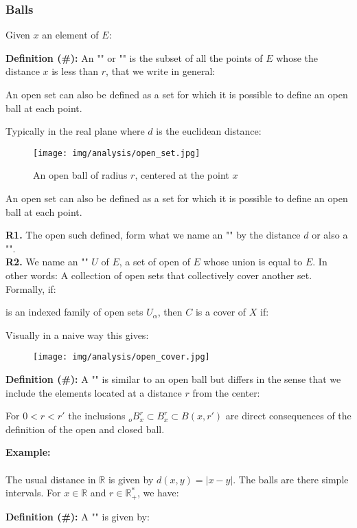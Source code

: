 	\subsubsection{Balls}
	Given $x$ an element of $E$:
	
	\textbf{Definition (\#\mydef):} An "" or "" is the subset of all the points of $E$ whose the distance $x$ is less than $r$, that we write in general:
	
	An open set can also be defined as a set for which it is possible to define an open ball at each point.
	
	Typically in the real plane where $d$ is the euclidean distance:
	
	\begin{figure}[H]
		\centering
		\texttt{[image: img/analysis/open\_set.jpg]}
		\caption{An open ball of radius $r$, centered at the point $x$}
	\end{figure}
	An open set can also be defined as a set for which it is possible to define an open ball at each point.
	\begin{tcolorbox}[title=Remarks,colframe=black,arc=10pt]
	\textbf{R1.} The open such defined, form what we name an "" by the distance $d$ or also a "".\\
	
	\textbf{R2.} We name an "" $U$ of $E$, a set of open of $E$ whose union is equal to $E$. In other words: A collection of open sets that collectively cover another set.\\
	
	Formally, if:
	
	is an indexed family of open sets $U_\alpha$, then $C$ is a cover of $X$ if:
	
	Visually in a naive way this gives:
	\begin{figure}[H]
		\centering
		\texttt{[image: img/analysis/open\_cover.jpg]}
	\end{figure}
	\end{tcolorbox}	
	\textbf{Definition (\#\mydef):} A "" is similar to an open ball but differs in the sense that we include the elements located at a distance $r$ from the center:
	
	\begin{tcolorbox}[title=Remark,colframe=black,arc=10pt]
	For $0<r<r'$ the inclusions $_oB_x^r \subset B_x^r \subset B(x,r')$ are direct consequences of the definition of the open and closed ball.
	\end{tcolorbox}
	\begin{tcolorbox}[colframe=black,colback=white,sharp corners]
	\textbf{{\Large {}}Example:}\\\\
	The usual distance in $\mathbb{R}$ is given by $d(x,y)=|x-y|$. The balls are there simple intervals. For $x \in \mathbb{R}$ and $r\in \mathbb{R}_{+}^{*}$, we have:
	
	\end{tcolorbox}
	\textbf{Definition (\#\mydef):} A "" is given by:
	
